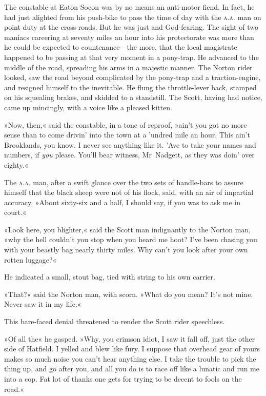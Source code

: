 The constable at Eaton Socon was by no means an anti-motor fiend. In fact, he had just alighted from his push-bike to pass the time of day with the \textsc{a.a.} man on point duty at the cross-roads. But he was just and God-fearing. The sight of two maniacs careering at seventy miles an hour into his protectorate was more than he could be expected to countenance—the more, that the local magistrate happened to be passing at that very moment in a pony-trap. He advanced to the middle of the road, spreading his arms in a majestic manner. The Norton rider looked, saw the road beyond complicated by the pony-trap and a traction-engine, and resigned himself to the inevitable. He flung the throttle-lever back, stamped on his squealing brakes, and skidded to a standstill. The Scott, having had notice, came up mincingly, with a voice like a pleased kitten.

»Now, then,« said the constable, in a tone of reproof, »ain't you got no more sense than to come drivin' into the town at a 'undred mile an hour. This ain't Brooklands, you know. I never see anything like it. 'Ave to take your names and numbers, if \textit{you} please. You'll bear witness, Mr~Nadgett, as they was doin' over eighty.«

The \textsc{a.a.} man, after a swift glance over the two sets of handle-bars to assure himself that the black sheep were not of his flock, said, with an air of impartial accuracy, »About sixty-six and a half, I should say, if you was to ask me in court.«

»Look here, you blighter,« said the Scott man indignantly to the Norton man, »why the hell couldn't you stop when you heard me hoot? I've been chasing you with your beastly bag nearly thirty miles. Why can't you look after your own rotten luggage?«

He indicated a small, stout bag, tied with string to his own carrier.

»That?« said the Norton man, with scorn. »What do you mean? It's not mine. Never saw it in my life.«

This bare-faced denial threatened to render the Scott rider speechless.

»Of all the\longdash« he gasped. »Why, you crimson idiot, I saw it fall off, just the other side of Hatfield. I yelled and blew like fury. I suppose that overhead gear of yours makes so much noise you can't hear anything else. I take the trouble to pick the thing up, and go after you, and all you do is to race off like a lunatic and run me into a cop. Fat lot of thanks one gets for trying to be decent to fools on the road.«

